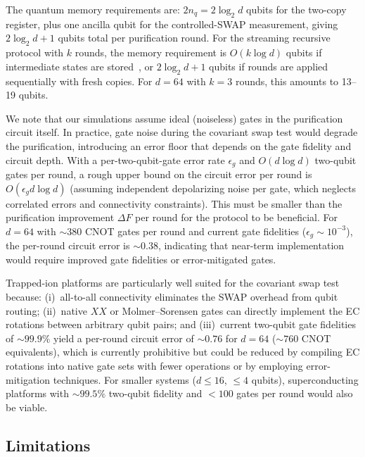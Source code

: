 \documentclass[prx,twocolumn,superscriptaddress,longbibliography,floatfix]{revtex4-2}
\begin{document}
The quantum memory requirements are: $2 n_q = 2\log_2 d$ qubits for the two-copy register, plus one ancilla qubit for the controlled-SWAP measurement, giving $2\log_2 d + 1$ qubits total per purification round.
For the streaming recursive protocol with $k$ rounds, the memory requirement is $O(k \log d)$ qubits if intermediate states are stored~\cite{Childs2025}, or $2\log_2 d + 1$ qubits if rounds are applied sequentially with fresh copies.
For $d = 64$ with $k = 3$ rounds, this amounts to 13--19 qubits.

We note that our simulations assume ideal (noiseless) gates in the purification circuit itself.
In practice, gate noise during the covariant swap test would degrade the purification, introducing an error floor that depends on the gate fidelity and circuit depth.
With a per-two-qubit-gate error rate $\epsilon_g$ and $O(d \log d)$ two-qubit gates per round, a rough upper bound on the circuit error per round is $O(\epsilon_g d \log d)$ (assuming independent depolarizing noise per gate, which neglects correlated errors and connectivity constraints).
This must be smaller than the purification improvement $\Delta F$ per round for the protocol to be beneficial.
For $d = 64$ with $\sim\!380$ CNOT gates per round and current gate fidelities ($\epsilon_g \sim 10^{-3}$), the per-round circuit error is $\sim\!0.38$, indicating that near-term implementation would require improved gate fidelities or error-mitigated gates.

Trapped-ion platforms are particularly well suited for the covariant swap test because: (i)~all-to-all connectivity eliminates the SWAP overhead from qubit routing; (ii)~native $XX$ or Molmer--Sorensen gates can directly implement the EC rotations between arbitrary qubit pairs; and (iii)~current two-qubit gate fidelities of $\sim\!99.9\%$ yield a per-round circuit error of $\sim\!0.76$ for $d = 64$ ($\sim\!760$ CNOT equivalents), which is currently prohibitive but could be reduced by compiling EC rotations into native gate sets with fewer operations or by employing error-mitigation techniques.
For smaller systems ($d \leq 16$, $\leq 4$ qubits), superconducting platforms with $\sim\!99.5\%$ two-qubit fidelity and $<\!100$ gates per round would also be viable.

\subsection{Limitations}
\label{sec:limitations}
\end{document}
